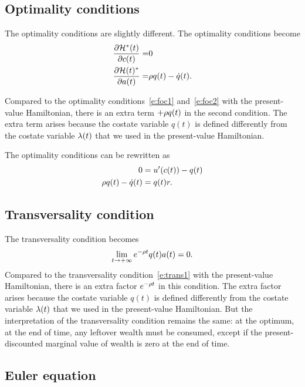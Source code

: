 \documentclass[letterpaper, 11pt, leqno]{article}
\begin{document}
\subsection{Optimality conditions}

The optimality conditions are slightly different. The optimality conditions become
\begin{align*}
\pd{\Hc^{*}(t)}{c(t)}=& 0\\
\pd{\Hc(t)^{*}}{a(t)}=&\r q(t)-\dot{q}(t).
\end{align*}

Compared to the optimality conditions~\eqref{e:foc1} and~\eqref{e:foc2} with the present-value Hamiltonian, there is an extra term $+\rho q(t)$ in the second condition. The extra term arises because the costate variable $q(t)$ is defined differently from the costate variable $\lambda(t)$ that we used in the present-value Hamiltonian. 

The optimality conditions can be rewritten as
\begin{align}
0 &= u'(c(t)) -q(t)\label{e:auto1}\\
\rho q(t)-\dot{q}(t)&= q(t) r.\label{e:auto2}
\end{align}

\subsection{Transversality condition}

The transversality condition becomes
\begin{equation*}
\lim_{t\to+\infty}e^{-\rho t} q(t) a(t)=0.
\end{equation*}
Compared to the transversality condition~\eqref{e:trans1} with the present-value Hamiltonian, there is an extra factor $e^{-\rho t}$ in this condition. The extra factor arises because the costate variable $q(t)$ is defined differently from the costate variable $\lambda(t)$ that we used in the present-value Hamiltonian. But the interpretation of the transversality condition remains the same: at the optimum, at the end of time, any leftover wealth must be consumed, except if the present-discounted marginal value of wealth is zero at the end of time.

\subsection{Euler equation}
\end{document}
